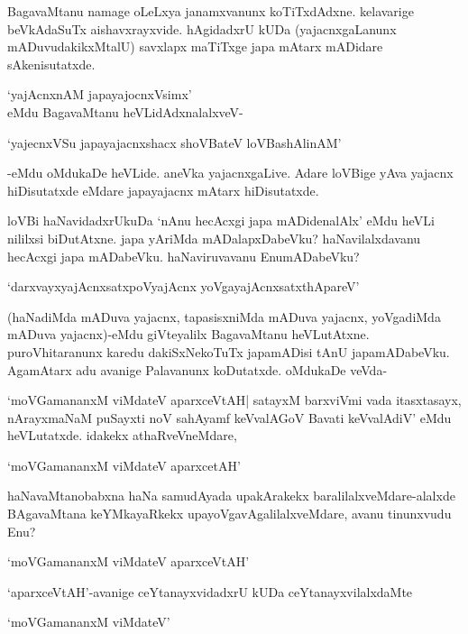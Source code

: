BagavaMtanu namage oLeLxya janamxvanunx koTiTxdAdxne. kelavarige beVkAdaSuTx aishavxrayxvide. hAgidadxrU kUDa (yajacnxgaLanunx mADuvudakikxMtalU) savxlapx maTiTxge japa mAtarx mADidare sAkenisutatxde.

\begin{shloka}
`yajAcnxnAM japayajocnxV\s simx'\\
eMdu BagavaMtanu heVLidAdxnalalxveV-
\end{shloka}

\begin{shloka}
`yajecnxVSu japayajacnxshacx shoVBateV loVBashAlinAM'
\end{shloka}

-eMdu oMdukaDe heVLide. aneVka yajacnxgaLive. Adare loVBige yAva yajacnx hiDisutatxde eMdare japayajacnx mAtarx hiDisutatxde.

loVBi haNavidadxrUkuDa `nAnu hecAcxgi japa mADidenalAlx' eMdu heVLi nililxsi biDutAtxne. japa yAriMda mADalapxDabeVku? haNavilalxdavanu hecAcxgi japa mADabeVku. haNaviruvavanu EnumADabeVku?

\begin{shloka}
`darxvayxyajAcnxsatxpoVyajAcnx yoVgayajAcnxsatxthApareV'
\end{shloka}

(haNadiMda mADuva yajacnx, tapasisxniMda mADuva yajacnx, yoVgadiMda mADuva yajacnx)-eMdu giVteyalilx BagavaMtanu heVLutAtxne. puroVhitaranunx karedu dakiSxNekoTuTx japamADisi tAnU japamADabeVku. AgamAtarx adu avanige Palavanunx koDutatxde. oMdukaDe veVda-

`moVGamananxM viMdateV aparxceVtAH| satayxM barxviVmi vada itasxtasayx, nArayxmaNaM puSayxti noV sahAyamf keVvalAGoV Bavati keVvalAdiV' eMdu heVLutatxde. idakekx athaRveVneMdare,

\begin{shloka}
`moVGamananxM viMdateV aparxcetAH'
\end{shloka}

haNavaMtanobabxna haNa samudAyada upakArakekx baralilalxveMdare-alalxde BAgavaMtana keYMkayaRkekx upayoVgavAgalilalxveMdare, avanu tinunxvudu Enu?

\begin{shloka}
`moVGamananxM viMdateV aparxceVtAH'
\end{shloka}

`aparxceVtAH'-avanige ceYtanayxvidadxrU kUDa ceYtanayxvilalxdaMte 

\begin{shloka}
`moVGamananxM viMdateV'
\end{shloka}

